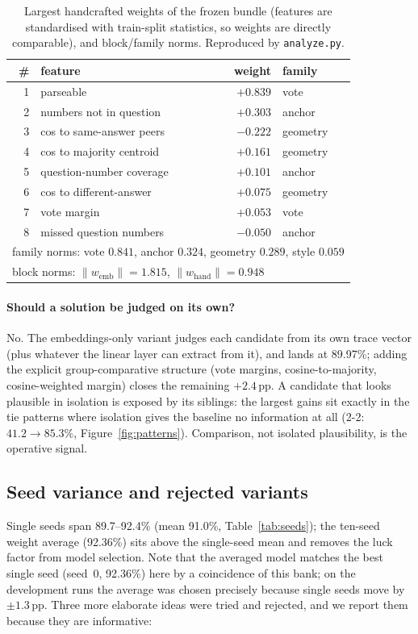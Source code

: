 \documentclass[10pt,a4paper]{article}
\newcommand{\ABEMB}{89.97}
\newcommand{\SEEDMIN}{89.7}
\newcommand{\SEEDMAX}{92.4}
\newcommand{\SEEDMEAN}{91.0}
\begin{document}
\begin{table}[t]
\centering\small
\caption{Largest handcrafted weights of the frozen bundle (features are
standardised with train-split statistics, so weights are directly comparable),
and block/family norms. Reproduced by \texttt{analyze.py}.}
\label{tab:weights}
\begin{tabular}{rlrl}
\hline
\# & feature & weight & family \\
\hline
1 & parseable & $+0.839$ & vote \\
2 & numbers not in question & $+0.303$ & anchor \\
3 & cos to same-answer peers & $-0.222$ & geometry \\
4 & cos to majority centroid & $+0.161$ & geometry \\
5 & question-number coverage & $+0.101$ & anchor \\
6 & cos to different-answer & $+0.075$ & geometry \\
7 & vote margin & $+0.053$ & vote \\
8 & missed question numbers & $-0.050$ & anchor \\
\hline
\multicolumn{4}{l}{family norms: vote $0.841$, anchor $0.324$, geometry $0.289$, style $0.059$} \\
\multicolumn{4}{l}{block norms: $\lVert w_{\text{emb}}\rVert = 1.815$, $\lVert w_{\text{hand}}\rVert = 0.948$} \\
\hline
\end{tabular}
\end{table}

\paragraph{Should a solution be judged on its own?} No. The embeddings-only
variant judges each candidate from its own trace vector (plus whatever the
linear layer can extract from it), and lands at \ABEMB\%; adding the explicit
group-comparative structure (vote margins, cosine-to-majority, cosine-weighted
margin) closes the remaining $+2.4$\,pp. A candidate that looks plausible in
isolation is exposed by its siblings: the largest gains sit exactly in the
tie patterns where isolation gives the baseline no information at all
(2-2: $41.2\to85.3\%$, Figure~\ref{fig:patterns}). Comparison, not isolated
plausibility, is the operative signal.

\subsection{Seed variance and rejected variants}
Single seeds span \SEEDMIN--\SEEDMAX\% (mean \SEEDMEAN\%, Table~\ref{tab:seeds});
the ten-seed weight average (92.36\%) sits above the single-seed mean and
removes the luck factor from model selection. Note that the averaged model
matches the best single seed (seed~0, 92.36\%) here by a coincidence of this
bank; on the development runs the average was chosen precisely because single
seeds move by $\pm1.3$\,pp. Three more elaborate ideas were tried and rejected,
and we report them because they are informative:
\end{document}
